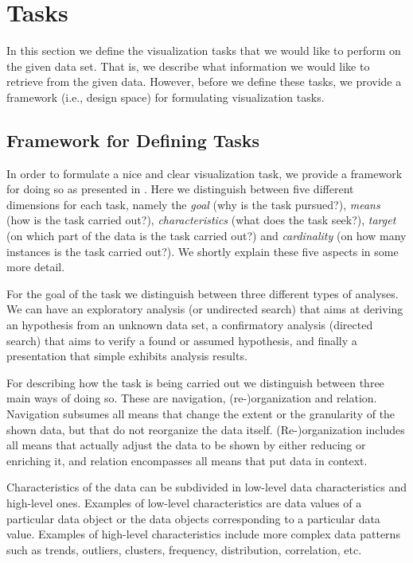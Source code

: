 \section{Tasks}\label{sec:tasks}

In this section we define the visualization tasks that we would like to perform on the given data set. That is, we describe what information we would like to retrieve from the given data. However, before we define these tasks, we provide a framework (i.e., design space) for formulating visualization tasks.

\subsection{Framework for Defining Tasks}
In order to formulate a nice and clear visualization task, we provide a framework for doing so as presented in \cite{schulz2013design}. Here we distinguish between five different dimensions for each task, namely the \textit{goal} (why is the task pursued?), \textit{means} (how is the task carried out?), \textit{characteristics} (what does the task seek?), \textit{target} (on which part of the data is the task carried out?) and \textit{cardinality} (on how many instances is the task carried out?). We shortly explain these five aspects in some more detail.

For the goal of the task we distinguish between three different types of analyses. We can have an exploratory analysis (or undirected search) that aims at deriving an hypothesis from an unknown data set, a confirmatory analysis (directed search) that aims to verify a found or assumed hypothesis, and finally a presentation that simple exhibits analysis results.

For describing how the task is being carried out we distinguish between three main ways of doing so. These are navigation, (re-)organization and relation. Navigation subsumes all means that change the extent or the granularity of the shown data, but that do not reorganize the data itself. (Re-)organization includes all means that actually adjust the data to be shown by either reducing or enriching it, and relation encompasses all means that put data in context.

Characteristics of the data can be subdivided in low-level data characteristics and high-level ones. Examples of low-level characteristics are data values of a particular data object or the data objects corresponding to a particular data value. Examples of high-level characteristics include more complex data patterns such as trends, outliers, clusters, frequency, distribution, correlation, etc.


